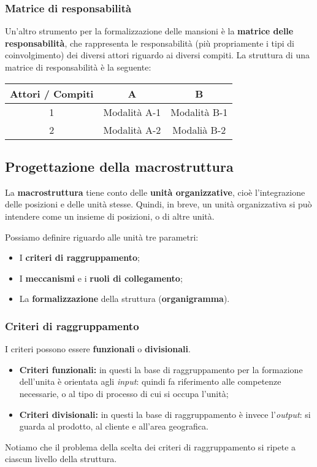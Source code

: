 \documentclass[a4paper,11pt]{article}
\begin{document}
\subsubsection{Matrice di responsabilità}
Un'altro strumento per la formalizzazione delle mansioni è la \textbf{matrice delle responsabilità}, che rappresenta le responsabilità (più propriamente i tipi di coinvolgimento) dei diversi attori riguardo ai diversi compiti.
La struttura di una matrice di responsabilità è la seguente:
\begin{table}[h!]
	\center {}
	\begin{tabular} {  c | c c }
		\bfseries Attori / Compiti & A & B \\
		\hline 
		1 & Modalità A-1 & Modalità B-1 \\ 
		2 & Modalità A-2 & Modalià B-2
	\end{tabular}
\end{table}

\subsection{Progettazione della macrostruttura}
La \textbf{macrostruttura} tiene conto delle \textbf{unità organizzative}, cioè l'integrazione delle posizioni e delle unità stesse.
Quindi, in breve, un unità organizzativa si può intendere come un insieme di posizioni, o di altre unità.

Possiamo definire riguardo alle unità tre parametri:
\begin{itemize}
	\item I \textbf{criteri di raggruppamento};
	\item I \textbf{meccanismi} e i \textbf{ruoli di collegamento};
	\item La \textbf{formalizzazione} della struttura (\textbf{organigramma}).
\end{itemize}

\subsubsection{Criteri di raggruppamento}
I criteri possono essere \textbf{funzionali} o \textbf{divisionali}.
\begin{itemize}
	\item \textbf{Criteri funzionali:} in questi la base di raggruppamento per la formazione dell'unita è orientata agli \textit{input}: quindi fa riferimento  alle competenze necessarie, o al tipo di processo di cui si occupa l'unità;
	\item \textbf{Criteri divisionali:} in questi la base di raggruppamento è invece l'\textit{output}: si guarda al prodotto, al cliente e all'area geografica.
\end{itemize}
Notiamo che il problema della scelta dei criteri di raggruppamento si ripete a ciascun livello della struttura.
\end{document}
